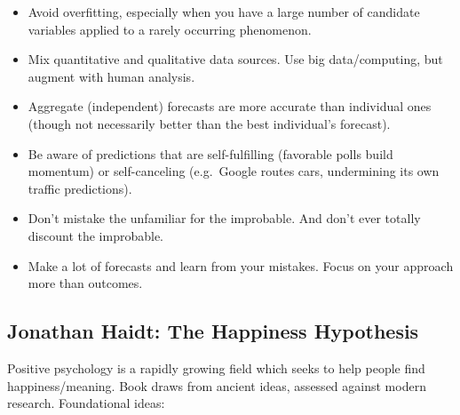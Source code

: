 \documentclass[
]{article}
\begin{document}
\begin{itemize}
\item
  Avoid overfitting, especially when you have a large number of
  candidate variables applied to a rarely occurring phenomenon.
\item
  Mix quantitative and qualitative data sources. Use big data/computing,
  but augment with human analysis.
\item
  Aggregate (independent) forecasts are more accurate than individual
  ones (though not necessarily better than the best individual's
  forecast).
\item
  Be aware of predictions that are self-fulfilling (favorable polls
  build momentum) or self-canceling (e.g.~Google routes cars,
  undermining its own traffic predictions).
\item
  Don't mistake the unfamiliar for the improbable. And don't ever
  totally discount the improbable.
\item
  Make a lot of forecasts and learn from your mistakes. Focus on your
  approach more than outcomes.
\end{itemize}

\hypertarget{jonathan-haidt-the-happiness-hypothesis}{%
\subsection{Jonathan Haidt: The Happiness
Hypothesis}\label{jonathan-haidt-the-happiness-hypothesis}}

Positive psychology is a rapidly growing field which seeks to help
people find happiness/meaning. Book draws from ancient ideas, assessed
against modern research. Foundational ideas:
\end{document}
